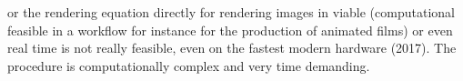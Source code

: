 \documentclass[%
    a4paper,    %
    justified,  %
    nobib,      %
    openany     %
]{tufte-book}
\begin{document}

 or the rendering equation
directly for rendering images in viable (computational feasible in a workflow
for instance for the production of animated films) or even real time is not
really feasible, even on the fastest modern hardware (2017). The procedure is
computationally complex and very time demanding.
\end{document}
